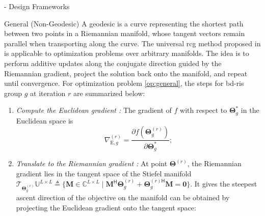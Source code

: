 \documentclass[journal]{IEEEtran}
\begin{document}
\begin{section}{- Design Frameworks}
	\begin{subsection}{General (Non-Geodesic) }
		A geodesic is a curve representing the shortest path between two points in a Riemannian manifold, whose tangent vectors remain parallel when transporting along the curve.
		The universal \gls{rcg} method proposed in \cite{Absil2009,Pan2022d} is applicable to optimization problems over arbitrary manifolds.
		The idea is to perform {additive} updates along the conjugate direction guided by the Riemannian gradient, {project} the solution back onto the manifold, and repeat until convergence.
		For optimization problem \eqref{op:general}, the steps for \gls{bd}-\gls{ris} group $g$ at iteration $r$ are summarized below:
		\begin{enumerate}
			\item \emph{Compute the Euclidean gradient \cite{Hjorungnes2007}:} The gradient of $f$ with respect to $\mathbf{\Theta}_g^*$ in the Euclidean space is
			\begin{equation}
				\nabla_{\mathrm{E},g}^{(r)} = \frac{\partial f(\mathbf{\Theta}_g^{(r)})}{\partial \mathbf{\Theta}_g^*};
				\label{eq:gradient_euclidean}
			\end{equation}
			\item \emph{Translate to the Riemannian gradient \cite{Absil2009}:} At point $\mathbf{\Theta}^{(r)}$, the Riemannian gradient lies in the tangent space of the Stiefel manifold $\mathcal{T}_{\mathbf{\Theta}_g^{(r)}}\mathbb{U}^{L \times L} \triangleq \{\mathbf{M} \in \mathbb{C}^{L \times L} \mid \mathbf{M}^\mathsf{H} \mathbf{\Theta}_g^{(r)} + {\mathbf{\Theta}_g^{(r)\mathsf{H}}} \mathbf{M} = \mathbf{0}\}$. It gives the steepest ascent direction of the objective on the manifold can be obtained by projecting the Euclidean gradient onto the tangent space:
			\begin{equation}

\end{equation}
\end{enumerate}
\end{subsection}
\end{section}
\end{document}
